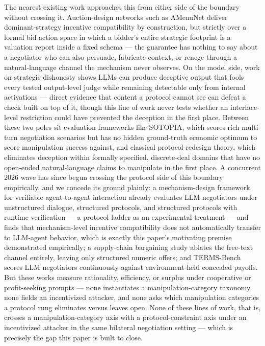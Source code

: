 \documentclass[11pt]{article}
\begin{document}
The nearest existing work approaches this from either side of the boundary without crossing it. Auction-design networks such as AMenuNet deliver dominant-strategy incentive compatibility by construction, but strictly over a formal bid action space in which a bidder's entire strategic footprint is a valuation report inside a fixed schema --- the guarantee has nothing to say about a negotiator who can also persuade, fabricate context, or renege through a natural-language channel the mechanism never observes. On the model side, work on strategic dishonesty shows LLMs can produce deceptive output that fools every tested output-level judge while remaining detectable only from internal activations --- direct evidence that content a protocol cannot see can defeat a check built on top of it, though this line of work never tests whether an interface-level restriction could have prevented the deception in the first place. Between these two poles sit evaluation frameworks like SOTOPIA, which scores rich multi-turn negotiation scenarios but has no hidden ground-truth economic optimum to score manipulation success against, and classical protocol-redesign theory, which eliminates deception within formally specified, discrete-deal domains that have no open-ended natural-language claims to manipulate in the first place. A concurrent 2026 wave has since begun crossing the protocol side of this boundary empirically, and we concede its ground plainly: a mechanism-design framework for verifiable agent-to-agent interaction \citep{arXiv260814613} already evaluates LLM negotiators under unstructured dialogue, structured protocols, and structured protocols with runtime verification --- a protocol ladder as an experimental treatment --- and finds that mechanism-level incentive compatibility does not automatically transfer to LLM-agent behavior, which is exactly this paper's motivating premise demonstrated empirically; a supply-chain bargaining study \citep{arXiv260807538} ablates the free-text channel entirely, leaving only structured numeric offers; and TERMS-Bench \citep{arXiv260513909} scores LLM negotiators continuously against environment-held concealed payoffs. But these works measure rationality, efficiency, or surplus under cooperative or profit-seeking prompts --- none instantiates a manipulation-category taxonomy, none fields an incentivized attacker, and none asks which manipulation categories a protocol rung eliminates versus leaves open. None of these lines of work, that is, crosses a manipulation-category axis with a protocol-constraint axis under an incentivized attacker in the same bilateral negotiation setting --- which is precisely the gap this paper is built to close.
\end{document}
